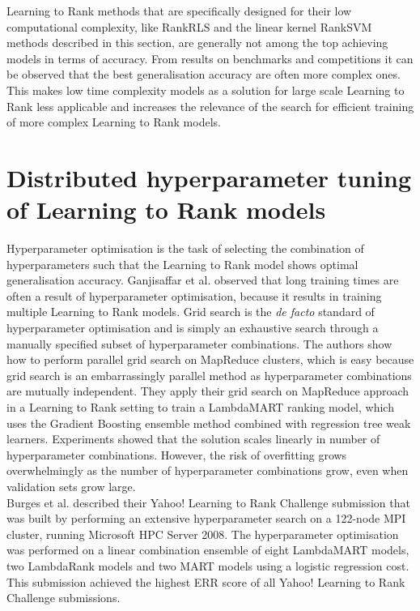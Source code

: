 Learning to Rank methods that are specifically designed for their low computational complexity, like RankRLS and the linear kernel Rank\ac{SVM} methods described in this section, are generally not among the top achieving models in terms of accuracy. From results on benchmarks and competitions it can be observed that the best generalisation accuracy are often more complex ones. This makes low time complexity models as a solution for large scale Learning to Rank less applicable and increases the relevance of the search for efficient training of more complex Learning to Rank models.\\ 

\section{Distributed hyperparameter tuning of Learning to Rank models}
Hyperparameter optimisation is the task of selecting the combination of hyperparameters such that the Learning to Rank model shows optimal generalisation accuracy. Ganjisaffar et al. \cite{Ganjisaffar2011, Ganjisaffar2011b} observed that long training times are often a result of hyperparameter optimisation, because it results in training multiple Learning to Rank models. Grid search is the \emph{de facto} standard of hyperparameter optimisation and is simply an exhaustive search through a manually specified subset of hyperparameter combinations. The authors show how to perform parallel grid search on MapReduce clusters, which is easy because grid search is an embarrassingly parallel method as hyperparameter combinations are mutually independent. They apply their grid search on MapReduce approach in a Learning to Rank setting to train a LambdaMART \cite{Wu2008} ranking model, which uses the Gradient Boosting \cite{Friedman2002} ensemble method combined with regression tree weak learners. Experiments showed that the solution scales linearly in number of hyperparameter combinations. However, the risk of overfitting grows overwhelmingly as the number of hyperparameter combinations grow, even when validation sets grow large.\\

Burges et al. \cite{Burges2011} described their Yahoo! Learning to Rank Challenge submission that was built by performing an extensive hyperparameter search on a 122-node MPI cluster, running Microsoft HPC Server 2008. The hyperparameter optimisation was performed on a linear combination ensemble of eight LambdaMART models, two LambdaRank models and two MART models using a logistic regression cost. This submission achieved the highest \ac{ERR} score of all Yahoo! Learning to Rank Challenge submissions.\\

